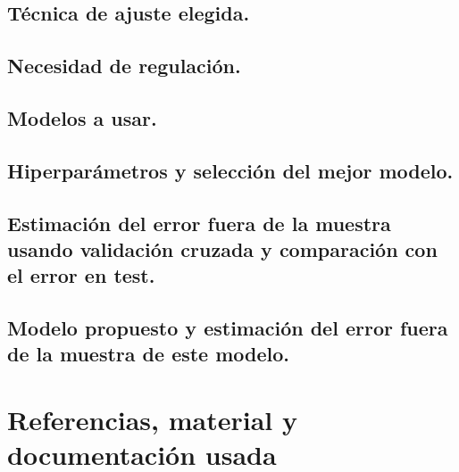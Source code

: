 \documentclass[12pt, spanish]{article}
\begin{document}
\subsection{Técnica de ajuste elegida.}

\subsection{Necesidad de regulación.}

\subsection{Modelos a usar.}

\subsection{Hiperparámetros y selección del mejor modelo.}

\subsection{Estimación del error fuera de la muestra usando validación cruzada y comparación con el error en test.}

\subsection{Modelo propuesto y estimación del error fuera de la muestra de este modelo.}


\newpage


\section{Referencias, material y documentación usada}
\end{document}
